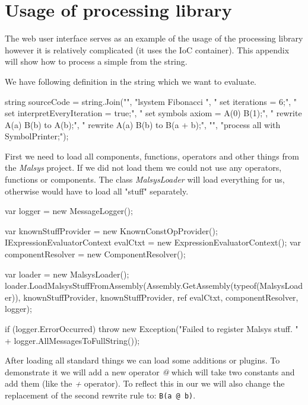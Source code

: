 

\chapter{Usage of \lsystem processing library}
\label{chap:libUsage}

The web user interface serves as an example of the usage of the \lsystem processing library however it is relatively complicated (it uses the IoC container).
This appendix will show how to process a simple \lsystem from the string.

We have following \lsystem definition in the string which we want to evaluate.

\begin{Csharp}
string sourceCode = string.Join("\n",
	"lsystem Fibonacci {",
	"	set iterations = 6;",
	"	set interpretEveryIteration = true;",
	"	set symbols axiom = A(0) B(1);",
	"	rewrite          A(a) { B(b) } to A(b);",
	"	rewrite { A(a) } B(b)          to B(a + b);",
	"}",
	"process all with SymbolPrinter;");
\end{Csharp}

First we need to load all components, functions, operators and other things from the \emph{Malsys} project.
If we did not load them we could not use any operators, functions or components.
The class \emph{MalsysLoader} will load everything for us, otherwise would have to load all "stuff" separately.

\begin{Csharp}
var logger = new MessageLogger();

var knownStuffProvider = new KnownConstOpProvider();
IExpressionEvaluatorContext evalCtxt = new ExpressionEvaluatorContext();
var componentResolver = new ComponentResolver();

var loader = new MalsysLoader();
loader.LoadMalsysStuffFromAssembly(Assembly.GetAssembly(typeof(MalsysLoader)),
	knownStuffProvider, knownStuffProvider, ref evalCtxt, componentResolver, logger);

if (logger.ErrorOccurred) {
	throw new Exception("Failed to register Malsys stuff. "
		+ logger.AllMessagesToFullString());
}
\end{Csharp}

After loading all standard things we can load some additions or plugins.
To demonstrate it we will add a new operator \emph{@} which will take two constants and add them (like the \emph{+} operator).
To reflect this in our \lsystem we will also change the replacement of the second rewrite rule to: \texttt{B(a @ b)}.


